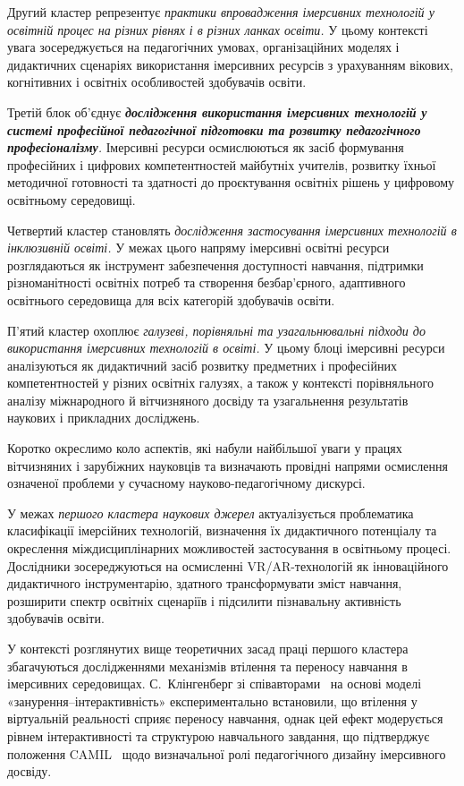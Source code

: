 Другий кластер репрезентує \emph{{практики впровадження імерсивних технологій у освітній процес на різних рівнях і в різних ланках освіти}.} У цьому контексті увага зосереджується на педагогічних умовах, організаційних моделях і дидактичних сценаріях використання імерсивних ресурсів з урахуванням вікових, когнітивних і освітніх особливостей здобувачів освіти.

Третій блок об'єднує \emph{\textbf{дослідження використання імерсивних технологій у системі професійної педагогічної підготовки та розвитку педагогічного професіоналізму}.} Імерсивні ресурси осмислюються як засіб формування професійних і цифрових компетентностей майбутніх учителів, розвитку їхньої методичної готовності та здатності до проєктування освітніх рішень у цифровому освітньому середовищі.

Четвертий кластер становлять \emph{{дослідження застосування імерсивних технологій в інклюзивній освіті}.} У межах цього напряму імерсивні освітні ресурси розглядаються як інструмент забезпечення доступності навчання, підтримки різноманітності освітніх потреб та створення безбар'єрного, адаптивного освітнього середовища для всіх категорій здобувачів освіти.

П'ятий кластер охоплює \emph{{галузеві, порівняльні та узагальнювальні підходи до використання імерсивних технологій в освіті}.} У цьому блоці імерсивні ресурси аналізуються як дидактичний засіб розвитку предметних і професійних компетентностей у різних освітніх галузях, а також у контексті порівняльного аналізу міжнародного й вітчизняного досвіду та узагальнення результатів наукових і прикладних досліджень.

Коротко окреслимо коло аспектів, які набули найбільшої уваги у працях вітчизняних і зарубіжних науковців та визначають провідні напрями осмислення означеної проблеми у сучасному науково-педагогічному дискурсі.


У межах \emph{{першого кластера наукових джерел}} актуалізується проблематика класифікації імерсійних технологій, визначення їх дидактичного потенціалу та окреслення міждисциплінарних можливостей застосування в освітньому процесі. Дослідники зосереджуються на осмисленні VR/AR-технологій як інноваційного дидактичного інструментарію, здатного трансформувати зміст навчання, розширити спектр освітніх сценаріїв і підсилити пізнавальну активність здобувачів освіти.

У контексті розглянутих вище теоретичних засад праці першого кластера збагачуються дослідженнями механізмів втілення та переносу навчання в імерсивних середовищах. С.~Клінгенберг зі співавторами~\cite{Klingenberg2024Embodiment} на основі моделі «занурення--інтерактивність» експериментально встановили, що втілення у віртуальній реальності сприяє переносу навчання, однак цей ефект модерується рівнем інтерактивності та структурою навчального завдання, що підтверджує положення CAMIL~\cite{Makransky2021CAMIL} щодо визначальної ролі педагогічного дизайну імерсивного досвіду.

